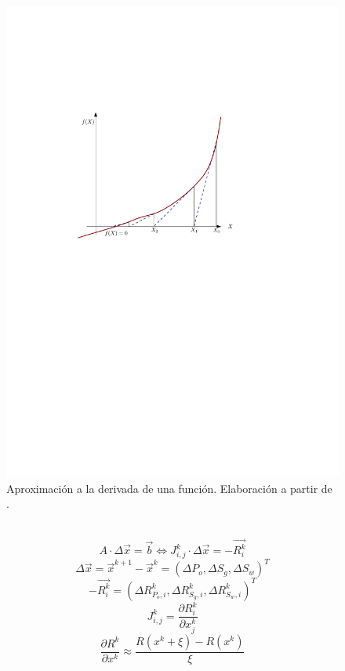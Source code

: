 \begin{figure}[h]
	\centering%
	\includegraphics[scale=0.8]{Fig/NewtonR.pdf}%
	\caption[Aproximación a la derivada de una función.]{Aproximación a la derivada de una función. {\color{red} Elaboración a partir de .}} \label{fig:NewtonR}
\end{figure}
~\\
\begin{equation}
A \cdot {\Delta \vec{x}} = \vec{b} \Leftrightarrow J^{k}_{i,j} \cdot {\Delta \vec{x}} = -\vec{R^{k}_{i}}
\end{equation}
\begin{equation}
\Delta \vec{x} = \vec{x}^{k+1} - \vec{x}^{k} = \left(\Delta P_o, \Delta S_g, \Delta S_w \right)^T
\end{equation}
\begin{equation}
-\vec{R^k_i} = \left(\Delta R^k_{P_o,i}, \Delta R^k_{S_g,i}, \Delta R^k_{S_w,i} \right)^T
\end{equation}
\begin{equation}
J^k_{i,j}=\frac{\partial R^k_i}{\partial x^k_j}	
\end{equation}
\begin{equation}
\frac{\partial R^k}{\partial x^k} \approx \frac{R\left(x^k + \xi \right) - R\left(x^k \right)}{\xi}
\end{equation}


